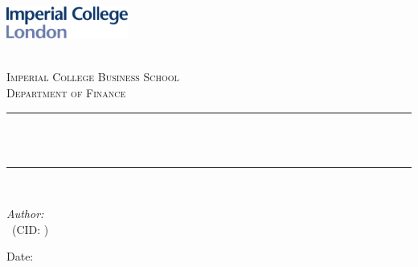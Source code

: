 \begin{titlepage}

\newcommand{\HRule}{\rule{\linewidth}{0.5mm}} %



\includegraphics[width = 4cm]{./figures/imperial}\\[0.5cm] 

\begin{center} %

\textsc{\LARGE \reporttype}\\[1.5cm] 
\textsc{\Large Imperial College Business School}\\[0.5cm] 
\textsc{\large Department of Finance}\\[0.5cm] 

\HRule \\[0.4cm]
{ \huge \bfseries \reporttitle}\\ %
\HRule \\[1.5cm]
\end{center}

\begin{flushleft} \large
\textit{Author:}\\
\reportauthor~(CID: \cid) %
\end{flushleft}
\vspace{2cm}
\makeatletter
Date: \@date 

\vfill %



\makeatother


\end{titlepage}


